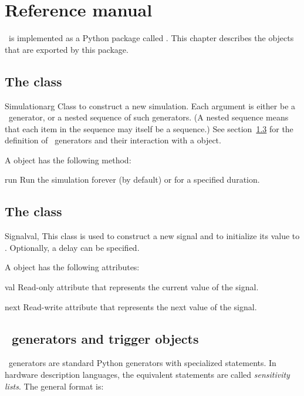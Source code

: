 \chapter{Reference manual}


\myhdl\ is implemented as a Python package called . This
chapter describes the objects that are exported by this package.

\section{The  class}
\begin{classdesc}{Simulation}{arg }
Class to construct a new simulation. Each argument is either be a
\myhdl\ generator, or a nested sequence of such generators. (A nested
sequence means that each item in the sequence may itself be a
sequence.) See section~\ref{myhdl-generators} for the definition of
\myhdl\ generators and their interaction with a 
object. 
\end{classdesc}

A  object has the following method:

\begin{methoddesc}[Simulation]{run}{}
Run the simulation forever (by default) or for a specified duration.
\end{methoddesc}

\section{The  class}
\label{signal}
\begin{classdesc}{Signal}{val, }
This class is used to construct a new signal and to initialize its
value to . Optionally, a delay can be specified.
\end{classdesc}

A  object has the following attributes:

\begin{memberdesc}[Signal]{val}
Read-only attribute that represents the current value of the signal. 
\end{memberdesc}
\begin{memberdesc}[Signal]{next}
Read-write attribute that represents the next value of the signal.
\end{memberdesc}

\section{\myhdl\ generators and trigger objects}
\label{myhdl-generators}
\myhdl\ generators are standard Python generators with specialized
 statements. In hardware description languages, the equivalent
statements are called \emph{sensitivity lists}. The general format is:

